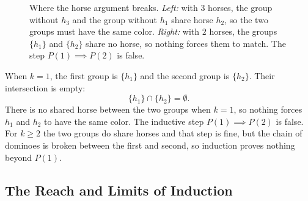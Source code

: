\begin{figure}[htbp]
\caption{Where the horse argument breaks. \emph{Left:} with $3$ horses, the group without $h_3$ and the group without $h_1$ share horse $h_2$, so the two groups must have the same color. \emph{Right:} with $2$ horses, the groups $\{h_1\}$ and $\{h_2\}$ share no horse, so nothing forces them to match. The step $P(1) \implies P(2)$ is false.}
\label{17:fig-horse-fallacy}
\end{figure}

When $k = 1$, the first group is $\{h_1\}$ and the second group is $\{h_2\}$. Their intersection is empty:
\[
\{h_1\} \cap \{h_2\} = \emptyset.
\]
There is no shared horse between the two groups when $k=1$, so nothing forces $h_1$ and $h_2$ to have the same color. The inductive step $P(1) \implies P(2)$ is false. For $k \ge 2$ the two groups do share horses and that step is fine, but the chain of dominoes is broken between the first and second, so induction proves nothing beyond $P(1)$.

\subsection{The Reach and Limits of Induction}

